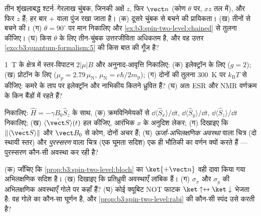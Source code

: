 \begin{exercise}[$\star$]\label{exo:b3:spin-two-level:3}
तीन शृंखलाबद्ध श्टर्न--गेरलाख चुंबक, जिनकी अक्षें $z$, फिर $\vect n$
(कोण $\theta$ पर, $xz$ तल में), और फिर $z$ हैं; हर बार $+$ वाला पुंज
रखा जाता है। (क) दूसरे चुंबक से बचने की प्रायिकता। (ख)
तीनों से बचने की। (ग) $\theta = 90^\circ$ पर मान निकालिए और
\cref{ex:b3:spin-two-level:chained} से तुलना कीजिए। (घ) किस
$\theta$ के लिए तीन-चुंबक उत्तरजीविता अधिकतम है, और वह उत्तर
\cref{exo:b3:quantum-formalism:5} की किस बात की गूँज है?
\end{exercise}

\begin{exercise}[$\star$]\label{exo:b3:spin-two-level:4}
\qty{1}{T} के क्षेत्र में स्तर-विपाटन $2|\mu|B$ और अनुनाद-आवृत्ति
निकालिए: (क) इलेक्ट्रॉन के लिए ($g = 2$); (ख)
प्रोटॉन के लिए ($\mu_p = 2.79\,\mu_{\text{N}}$, $\mu_{\text{N}} =
e\hbar/2m_{\text{p}}$); (ग) दोनों की तुलना \qty{300}{K} पर
$k_{\text{B}}T$ से कीजिए: कमरे के ताप पर इलेक्ट्रॉन और नाभिकीय 
कितने ध्रुवित हैं? (घ) अतः ESR और NMR वर्णक्रम के किन बैंडों में
रहते हैं?
\end{exercise}

\begin{exercise}[$\star\star$]\label{exo:b3:spin-two-level:5}
 निकालिए: $\hat H = -\gamma B_0\hat S_z$ के साथ, (क)
क्रमविनिमेयकों से $\dd\langle\hat S_x\rangle/\dd t$, $\dd\langle\hat
S_y\rangle/\dd t$, $\dd\langle\hat S_z\rangle/\dd t$
निकालिए; (ख) $\langle\hat{\vect S}\rangle(t)$ हल कीजिए, आरंभिक 
$x$ के अनुदिश लेकर; (ग) दिखाइए कि $\|\langle\hat{\vect S}\rangle\|$
और $\vect B_0$ से कोण, दोनों अचर हैं; (घ)
\emph{ऊर्जा-अभिलक्षणिक अवस्था} वाला चित्र (दो स्थायी स्तर) और
\emph{पुरस्सरण} वाला चित्र (एक घूमता सदिश) एक ही भौतिकी का वर्णन
क्यों करते हैं --- पुरस्सरण कौन-सी अवस्था कर रही है?
\end{exercise}

\begin{exercise}[$\star\star$]\label{exo:b3:spin-two-level:6}
(क) जाँचिए कि \cref{prop:b3:spin-two-level:bloch} का
$\ket{+\vect n}$ वही दावा किया गया अभिलक्षणिक सदिश है। (ख)
दिखाइए कि प्रतिध्रुवी अवस्थाएँ लांबिक हैं। (ग) $\sigma_x$ और
$\sigma_y$ की अभिलक्षणिक अवस्थाएँ गोले पर कहाँ हैं? (घ) कोई क्यूबिट
NOT फाटक $\ket\uparrow \leftrightarrow \ket\downarrow$ भेजता है:
वह गोले का कौन-सा घूर्णन है, और
\cref{prop:b3:spin-two-level:rabi} की कौन-सी स्पंद उसे करती है?
\end{exercise}

